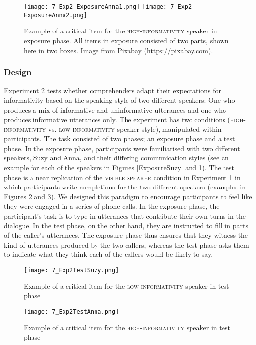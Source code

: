 \documentclass[output=paper,colorlinks,citecolor=brown]{langscibook}
\begin{document}
\begin{figure}%
\texttt{[image: 7\_Exp2-ExposureAnna1.png]}
\hfill
\texttt{[image: 7\_Exp2-ExposureAnna2.png]}
\caption{Example of a critical item for the \textsc{high-informativity} speaker in exposure phase. All items in exposure consisted of two parts, shown here in two boxes. Image from Pixabay (\url{https://pixabay.com}).}\label{ExposureAnna}
\end{figure}

\subsubsection{Design}

Experiment 2 tests whether comprehenders adapt their expectations for informativity based on the speaking style of two different speakers: One who produces a mix of informative and uninformative utterances and one who produces informative utterances only. The experiment has two conditions (\textsc{high-informativity} vs. \textsc{low-informativity} speaker style), manipulated within participants. The task consisted of two phases; an exposure phase and a test phase. In the exposure phase, participants were familiarised with two different speakers, Suzy and Anna, and their differing communication styles (see an example for each of the speakers in Figures \ref{ExposureSuzy} and \ref{ExposureAnna}). The test phase is a near replication of the \textsc{visible speaker} condition in Experiment 1 in which participants write completions for the two different speakers (examples in Figures \ref{TestSuzy} and \ref{TestAnna}). We designed this paradigm to encourage participants to feel like they were engaged in a series of phone calls. In the exposure phase, the participant's task is to type in utterances that contribute their own turns in the dialogue. In the test phase, on the other hand, they are instructed to fill in parts of the caller's utterances. The exposure phase thus ensures that they witness the kind of utterances produced by the two callers, whereas the test phase asks them to indicate what they think each of the callers would be likely to say. 

\begin{figure}%
\texttt{[image: 7\_Exp2TestSuzy.png]}
\caption{Example of a critical item for the \textsc{low-informativity} speaker in test phase}\label{TestSuzy}
\end{figure}
\begin{figure}%
\texttt{[image: 7\_Exp2TestAnna.png]}
\caption{Example of a critical item for the \textsc{high-informativity} speaker in test phase}\label{TestAnna}
\end{figure}
\end{document}
